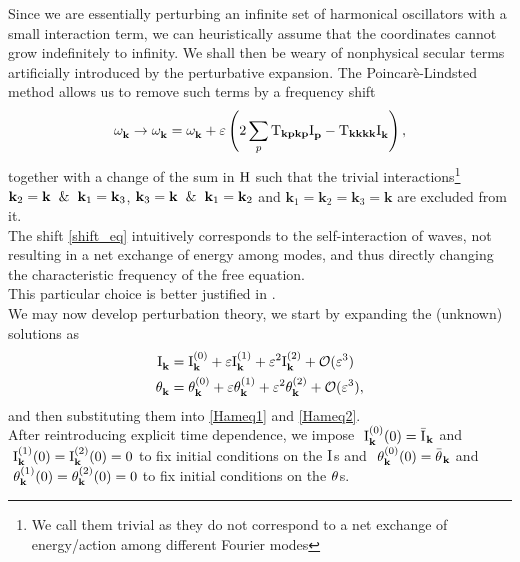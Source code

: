 Since we are essentially perturbing an infinite set of harmonical oscillators with a small interaction term, we can heuristically assume that
the coordinates cannot grow indefinitely to infinity. We shall then be weary of nonphysical secular terms artificially introduced by the perturbative
expansion. The Poincarè-Lindsted method allows us to remove such terms by a frequency shift
\begin{equation}
    \omega^{}_{\mathbf{k}} \rightarrow \omega^{}_{\mathbf{k}} = \omega^{}_{\mathbf{k}} + \varepsilon \left(2\sum_p \mathrm{T}_{\mathbf{kpkp}}\mathrm{I}^{}_\mathbf{p} - 
    \mathrm{T}_{\mathbf{kkkk}}\mathrm{I}^{}_\mathbf{k} \right),
    \label{shift_eq}
\end{equation}   
together with a change of the sum in $\mathrm{H}$ such that the trivial interactions\footnote{
    We call them trivial as they do not correspond to a net exchange of energy/action among different Fourier modes
} $\mathbf{k}_2=\mathbf{k} \hspace{2mm}\&\hspace{2mm} \mathbf{k}_1 = \mathbf{k}_3$, $\mathbf{k}_3=\mathbf{k} \hspace{2mm}\& \hspace{2mm}\mathbf{k}_1=\mathbf{k}_2$ and $\mathbf{k}_1=\mathbf{k}_2=\mathbf{k}_3=\mathbf{k}$ are excluded from it. \\
The shift \eqref{shift_eq} intuitively corresponds to the self-interaction of waves, not resulting in a net exchange of energy among modes, and thus directly changing 
the characteristic frequency of the free equation. \\ 
This particular choice is better justified in \cite{Nazarenko2011}. \\

We may now develop perturbation theory, we start by expanding the (unknown) solutions as
\begin{align}
    \mathrm{I}^{}_\mathbf{k} &= \mathrm{I}^{(0)}_\mathbf{k}  + \varepsilon \mathrm{I}^{(1)}_\mathbf{k} + \varepsilon^2 \mathrm{I}^{(2)}_\mathbf{k} + \mathcal{O}(\varepsilon^3) \\
    \theta^{}_\mathbf{k} &= \theta^{(0)}_\mathbf{k} + \varepsilon \theta^{(1)}_\mathbf{k} + \varepsilon^2 \theta^{(2)}_\mathbf{k} + \mathcal{O}(\varepsilon^3),
\end{align}
and then substituting them into \eqref{Hameq1} and \eqref{Hameq2}. \\
After reintroducing explicit time dependence, we impose \(\ \mathrm{I}^{(0)}_\mathbf{k}(0) = \bar{\mathrm{I}^{}}_\mathbf{k}\) and \(\ \mathrm{I}^{(1)}_\mathbf{k}(0) = \mathrm{I}^{(2)}_\mathbf{k}(0) = 0\) to fix initial conditions on the $\mathrm{I}^{}$s and 
$\ \thaz_\mathbf{k}(0) = \bar{\tha}_\mathbf{k}$ and $\ \theta^{(1)}_\mathbf{k}(0) = \theta^{(2)}_\mathbf{k}(0) = 0$ to fix initial conditions on the $\theta^{}$s.\\

